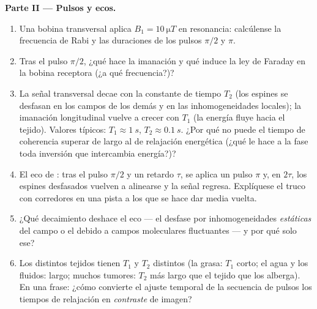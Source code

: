 \begin{problem}
\medskip\noindent\textbf{Parte II --- Pulsos y ecos.}
\begin{enumerate}[resume]
  \item Una bobina transversal aplica $B_1 = \qty{10}{\micro T}$ en
        resonancia: calcúlense la frecuencia de Rabi y las duraciones de los
        pulsos $\pi/2$ y $\pi$.
  \item Tras el pulso $\pi/2$, ¿qué hace la imanación y
        qué induce la ley de Faraday en la bobina receptora (¿a qué
        frecuencia?)?
  \item La señal transversal decae con la constante de tiempo $T_2$
        (los espines se desfasan en los campos de los demás y en las
        inhomogeneidades locales); la imanación longitudinal vuelve a
        crecer con $T_1$ (la energía fluye hacia el tejido). Valores
        típicos: $T_1 \approx \qty{1}{s}$, $T_2 \approx \qty{0.1}{s}$.
        ¿Por qué no puede el tiempo de coherencia superar de largo al de
        relajación energética (¿qué le hace a la fase toda inversión que
        intercambia energía?)?
  \item El eco de : tras el pulso $\pi/2$ y un retardo $\tau$,
        se aplica un pulso $\pi$ y, en $2\tau$, los espines desfasados
        vuelven a alinearse y la señal regresa. Explíquese el truco
        con corredores en una pista a los que se hace dar media vuelta.
  \item ¿Qué decaimiento deshace el eco --- el desfase por
        inhomogeneidades \emph{estáticas} del campo o el debido a campos
        moleculares fluctuantes --- y por qué solo ese?
  \item Los distintos tejidos tienen $T_1$ y $T_2$ distintos (la grasa:
        $T_1$ corto; el agua y los fluidos: largo; muchos tumores: $T_2$
        más largo que el tejido que los alberga). En una frase: ¿cómo
        convierte el ajuste temporal de la secuencia de pulsos los tiempos
        de relajación en \emph{contraste} de imagen?
\end{enumerate}


\end{problem}
